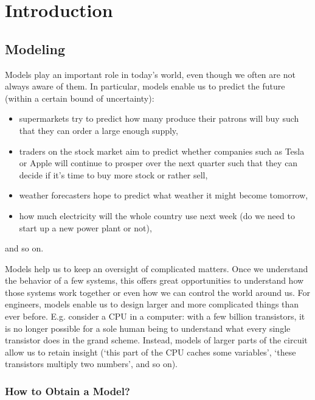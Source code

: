 \chapter{Introduction}
\def\thisDir{ch01-intro}
\glsresetall
{}

\section{Modeling}
Models play an important role in today's world, even though we often are not always aware of them.
In particular, models enable us to predict the future (within a certain bound of uncertainty):
\begin{itemize}
  \item supermarkets try to predict how many produce their patrons will buy such that they can order a large enough supply,
  \item traders on the stock market aim to predict whether companies such as Tesla or Apple will continue to prosper over the next quarter such that they can decide if it's time to buy more stock or rather sell,
  \item weather forecasters hope to predict what weather it might become tomorrow,
  \item how much electricity will the whole country use next week (do we need to start up a new power plant or not),
\end{itemize}
and so on.

Models help us to keep an oversight of complicated matters.
Once we understand the behavior of a few systems, this offers great opportunities to understand how those systems work together or even how we can control the world around us.
For engineers, models enable us to design larger and more complicated things than ever before.
E.g. consider a \gls{CPU} in a computer: with a few billion transistors, it is no longer possible for a sole human being to understand what every single transistor does in the grand scheme.
Instead, models of larger parts of the circuit allow us to retain insight (`this part of the \gls{CPU} caches some variables', `these transistors multiply two numbers', and so on).

\subsection{How to Obtain a Model?}

